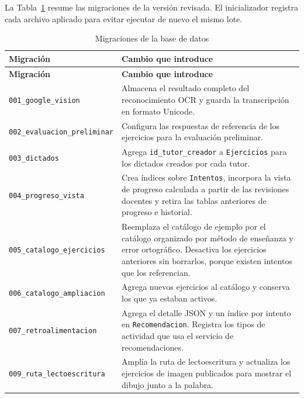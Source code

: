 La Tabla~\ref{tab:migraciones} resume las migraciones de la versión revisada. El inicializador registra cada archivo aplicado para evitar ejecutar de nuevo el mismo lote.

\begin{longtable}{|p{5.5cm}|p{8.1cm}|}
\caption{Migraciones de la base de datos}
\label{tab:migraciones} \\

\hline
\textbf{Migración} & \textbf{Cambio que introduce} \\
\hline
\endfirsthead

\hline
\textbf{Migración} & \textbf{Cambio que introduce} \\
\hline
\endhead

\texttt{001\_google\_vision} & Almacena el resultado completo del reconocimiento OCR y guarda la transcripción en formato Unicode. \\
\hline
\texttt{002\_evaluacion\_preliminar} & Configura las respuestas de referencia de los ejercicios para la evaluación preliminar. \\
\hline
\texttt{003\_dictados} & Agrega \texttt{id\_tutor\_creador} a \texttt{Ejercicios} para los dictados creados por cada tutor. \\
\hline
\texttt{004\_progreso\_vista} & Crea índices sobre \texttt{Intentos}, incorpora la vista de progreso calculada a partir de las revisiones docentes y retira las tablas anteriores de progreso e historial. \\
\hline
\texttt{005\_catalogo\_ejercicios} & Reemplaza el catálogo de ejemplo por el catálogo organizado por método de enseñanza y error ortográfico. Desactiva los ejercicios anteriores sin borrarlos, porque existen intentos que los referencian. \\
\hline
\texttt{006\_catalogo\_ampliacion} & Agrega nuevos ejercicios al catálogo y conserva los que ya estaban activos. \\
\hline
\texttt{007\_retroalimentacion} & Agrega el detalle JSON y un índice por intento en \texttt{Recomendacion}. Registra los tipos de actividad que usa el servicio de recomendaciones. \\
\hline
\texttt{009\_ruta\_lectoescritura} & Amplía la ruta de lectoescritura y actualiza los ejercicios de imagen publicados para mostrar el dibujo junto a la palabra. \\
\hline

\end{longtable}

